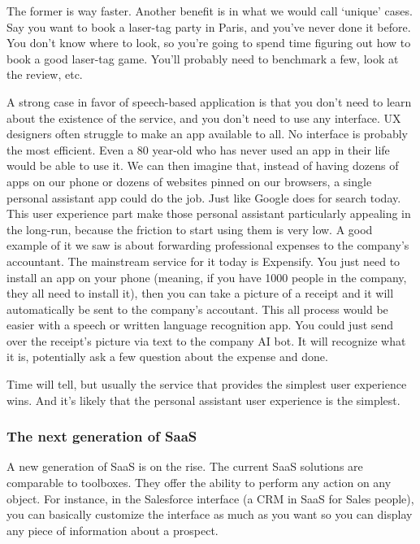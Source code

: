 \documentclass[12pt]{article}
\begin{document}
The former is way faster. Another benefit is in what we would call \lq unique\rq
cases. Say you want to book a laser-tag party in Paris, and you've never done it
before. You don't know where to look, so you're going to spend time figuring out
how to book a good laser-tag game. You'll probably need to benchmark a few,
look at the review, etc.

A strong case in favor of speech-based application is that you don't need to
learn about the existence of the service, and you don't need to use any
interface. UX designers often struggle to make an app available to all. No
interface is probably the most efficient. Even a 80 year-old who has never used
an app in their life would be able to use it. We can then imagine that, instead
of having dozens of apps on our phone or dozens of websites pinned on our
browsers, a single personal assistant app could do the job. Just like Google
does for search today. This user experience part make those personal assistant
particularly appealing in the long-run, because the friction to start using them
is very low. A good example of it we saw is about forwarding professional
expenses to the company's accountant. The mainstream service for it today is
Expensify. You just need to install an app on your phone (meaning, if you have
1000 people in the company, they all need to install it), then you can take a
picture of a receipt and it will automatically be sent to the company's
accoutant. This all process would be easier with a speech or written language
recognition app. You could just send over the receipt's picture via text to the
company AI bot. It will recognize what it is, potentially ask a few question
about the expense and done.

Time will tell, but usually the service that provides the simplest user
experience wins. And it's likely that the personal assistant user experience is
the simplest.


\subsubsection{The next generation of SaaS}

A new generation of SaaS is on the rise. The current SaaS solutions are
comparable to toolboxes. They offer the ability to perform any action on any
object. For instance, in the Salesforce interface (a CRM in SaaS for Sales
people), you can basically customize the interface as much as you want so you
can display any piece of information about a prospect.
\end{document}
